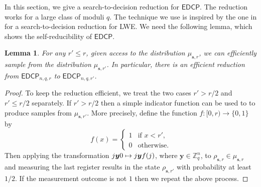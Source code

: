 \documentclass[11pt]{article}
\theoremstyle{plain}
\newtheorem{lemma}[theorem]{Lemma}
\theoremstyle{definition}
\let\ket\relax
\DeclarePairedDelimiter{\ket}{\lvert}{\rangle}
\def\Z{\mathbb{Z}}
\def\edcp{\mathsf{EDCP}}
\begin{document}
In this section, we give a search-to-decision reduction for $\edcp$. The reduction works for a large class of moduli $q$. The technique we use is inspired by the one in \cite{micciancio2012trapdoors} for a search-to-decision reduction for LWE. We need the following lemma, which shows the self-reducibility of $\edcp$.
\begin{lemma}
    \label{lem:self-rd}
    For any $r' \le r$, given access to the distribution $\mu_{\bm{s}, r}$, we can efficiently sample from the distribution $\mu_{\bm{s}, r'}$. In particular, there is an efficient reduction from $\edcp_{n, q, r}$ to $\edcp_{n, q, r'}$.
\end{lemma}
\begin{proof}
    To keep the reduction efficient, we treat the two cases $r' > r / 2$ and $r' \le r / 2$ separately. If $r' > r / 2$ then a simple indicator function can be used to to produce samples from $\mu_{\bm{s}, r'}$. More precisely, define the function $f: [0, r) \rightarrow \{ 0, 1 \}$ by
    \[ f(x) = 
    \begin{cases}
        1 & \text{if } x < r', \\
        0 & \text{otherwise}.
    \end{cases} \]
    Then applying the transformation $\ket{j}\ket{\bm{y}}\ket{0} \mapsto \ket{j}\ket{\bm{y}}\ket{f(j)}$, where $\bm{y} \in \Z_q^n$, to $\rho_{\bm{s}, r} \in \mu_{\bm{s}, r}$ and measuring the last register results in the state $\rho_{\bm{s}, r'}$ with probability at least $1 / 2$. If the measurement outcome is not $1$ then we repeat the above process.


\end{proof}
\end{document}
